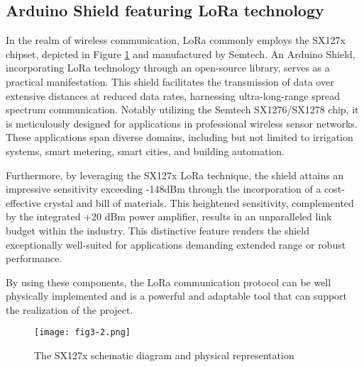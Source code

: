 \subsection{Arduino Shield featuring LoRa technology}
In the realm of wireless communication, LoRa commonly employs the SX127x chipset, depicted in Figure \ref{fig:3-2} and manufactured by Semtech. An Arduino Shield, incorporating LoRa technology through an open-source library, serves as a practical manifestation. This shield facilitates the transmission of data over extensive distances at reduced data rates, harnessing ultra-long-range spread spectrum communication. Notably utilizing the Semtech SX1276/SX1278 chip, it is meticulously designed for applications in professional wireless sensor networks. These applications span diverse domains, including but not limited to irrigation systems, smart metering, smart cities, and building automation.

Furthermore, by leveraging the SX127x LoRa technique, the shield attains an impressive sensitivity exceeding -148dBm through the incorporation of a cost-effective crystal and bill of materials. This heightened sensitivity, complemented by the integrated +20 dBm power amplifier, results in an unparalleled link budget within the industry. This distinctive feature renders the shield exceptionally well-suited for applications demanding extended range or robust performance.

By using these components, the LoRa communication protocol can be well physically implemented and is a powerful and adaptable tool that can support the realization of the project.
\begin{figure}
  \centering
  \texttt{[image: fig3-2.png]}
  \caption{The SX127x schematic diagram and physical representation}
  \label{fig:3-2}
\end{figure}

